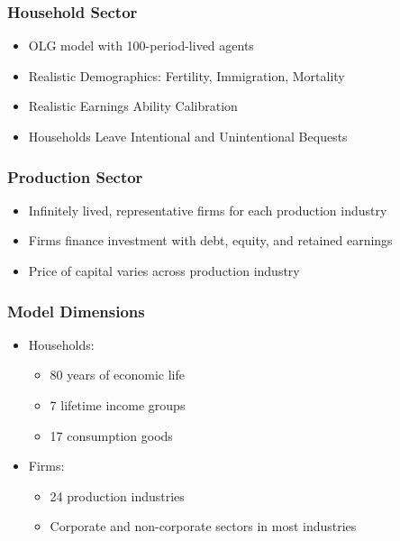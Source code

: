 \documentclass{beamer}
\begin{document}
  \begin{frame}
    \frametitle{Household Sector}
    \begin{itemize}
      \item OLG model with 100-period-lived agents
      \item Realistic Demographics: Fertility, Immigration, Mortality
      \item Realistic Earnings Ability Calibration
      \item Households Leave Intentional and Unintentional Bequests
    \end{itemize}
  \end{frame}


  \begin{frame}
    \frametitle{Production Sector}
    \begin{itemize}
      \item Infinitely lived, representative firms for each production industry
      \item Firms finance investment with debt, equity, and retained earnings
      \item Price of capital varies across production industry
    \end{itemize}
  \end{frame}

  \begin{frame}
  \frametitle{Model Dimensions}
  \begin{itemize}
    \item Households:
    \begin{itemize}
  		\item 80 years of economic life
  		\item 7 lifetime income groups
  		\item 17 consumption goods
  		\end{itemize}
    \item Firms:
    \begin{itemize}
    	\item 24 production industries
    	\item Corporate and non-corporate sectors in most industries
    	\end{itemize}
    \end{itemize}
  \end{frame}
\end{document}
